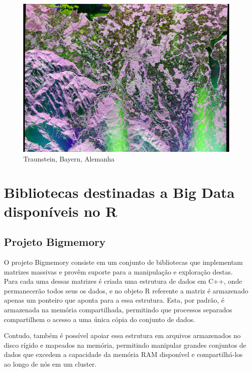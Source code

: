 \documentclass[12pt]{article}
\begin{document}
\begin{figure}[!ht]
	\begin{center}
		\includegraphics[width = 120mm, scale = 0.5]{../../Images/Report_07_18/mlc_pauli_image_low_resolution} \\ 
        Traunstein, Bayern, Alemanha\\
	\end{center}
\end{figure}

\section{Bibliotecas destinadas a Big Data disponíveis no R}

\subsection{Projeto Bigmemory}

O projeto Bigmemory consiste em um conjunto de bibliotecas que implementam matrizes massivas e provêm suporte para a manipulação e exploração destas. Para cada uma dessas matrizes é criada uma estrutura de dados em C++, onde permanecerão todos seus os dados, e no objeto R referente a matriz é armazenado apenas um ponteiro que aponta para a essa estrutura. Esta, por padrão, é armazenada na memória compartilhada, permitindo que processos separados compartilhem o acesso a uma única cópia do conjunto de dados.

Contudo, também é possível apoiar essa estrutura em arquivos armazenados no disco rígido e mapeados na memória, permitindo manipular grandes conjuntos de dados que excedem a capacidade da memória RAM disponível e compartilhá-los ao longo de nós em um cluster.
\end{document}
